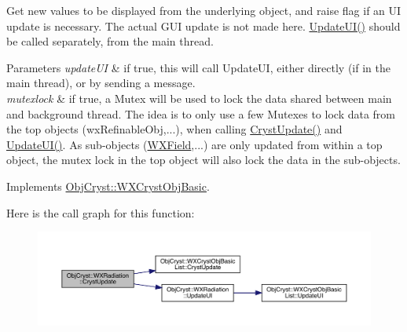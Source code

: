 Get new values to be displayed from the underlying object, and raise flag if an UI update is necessary. The actual G\+UI update is not made here. \mbox{\hyperlink{class_obj_cryst_1_1_w_x_radiation_abb1a51ad74c6072019e28bdc19085ecb}{Update\+U\+I()}} should be called separately, from the main thread.


\begin{DoxyParams}{Parameters}
{\em update\+UI} & if true, this will call Update\+UI, either directly (if in the main thread), or by sending a message. \\
\hline
{\em mutexlock} & if true, a Mutex will be used to lock the data shared between main and background thread. The idea is to only use a few Mutexes to lock data from the top objects (wx\+Refinable\+Obj,...), when calling \mbox{\hyperlink{class_obj_cryst_1_1_w_x_radiation_a4a9fcb2010f116506ffebd7a59f55359}{Cryst\+Update()}} and \mbox{\hyperlink{class_obj_cryst_1_1_w_x_radiation_abb1a51ad74c6072019e28bdc19085ecb}{Update\+U\+I()}}. As sub-\/objects (\mbox{\hyperlink{class_obj_cryst_1_1_w_x_field}{W\+X\+Field}},...) are only updated from within a top object, the mutex lock in the top object will also lock the data in the sub-\/objects. \\
\hline
\end{DoxyParams}


Implements \mbox{\hyperlink{class_obj_cryst_1_1_w_x_cryst_obj_basic_a7ac00ae2ae28f1a6fa26e6fa571186b6}{Obj\+Cryst\+::\+W\+X\+Cryst\+Obj\+Basic}}.

Here is the call graph for this function\+:
\nopagebreak
\begin{figure}[H]
\begin{center}
\leavevmode
\includegraphics[width=350pt]{class_obj_cryst_1_1_w_x_radiation_a4a9fcb2010f116506ffebd7a59f55359_cgraph}
\end{center}
\end{figure}
\mbox{\label{class_obj_cryst_1_1_w_x_radiation_abb1a51ad74c6072019e28bdc19085ecb}} 
